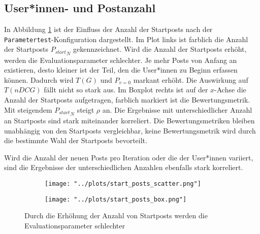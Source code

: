 \subsection{User*innen- und Postanzahl}

In Abbildung \ref{fig:start_posts} ist der Einfluss der Anzahl der Startposts nach der \texttt{Parametertest}-Konfiguration dargestellt. Im Plot links ist farblich die Anzahl der Startposts ${P_{start}}_N$ gekennzeichnet. Wird die Anzahl der Startposts erhöht, werden die Evaluationsparameter schlechter. Je mehr Posts von Anfang an existieren, desto kleiner ist der Teil, den die User*innen zu Beginn erfassen können. Dadurch wird $T(G)$  und $P_{v=0}$ markant erhöht. Die Auswirkung auf $T(nDCG)$ fällt nicht so stark aus. Im Boxplot rechts ist auf der $x$-Achse die Anzahl der Startposts aufgetragen, farblich markiert ist die Bewertungsmetrik. Mit steigendem ${P_{start}}_N$ steigt $\rho$ an. Die Ergebnisse mit unterschiedlicher Anzahl an Startposts sind stark miteinander korreliert. Die Bewertungsmetriken bleiben unabhängig von den Startposts vergleichbar, keine Bewertungsmetrik wird durch die bestimmte Wahl der Startposts bevorteilt.

Wird die Anzahl der neuen Posts pro Iteration oder die der User*innen variiert, sind die Ergebnisse der unterschiedlichen Anzahlen ebenfalls stark korreliert.

\begin{figure}[!h]
	\begin{subfigure}{0.5\textwidth}
		\texttt{[image: "../plots/start\_posts\_scatter.png"]}
	\end{subfigure}
	\begin{subfigure}{0.5\textwidth}
		\texttt{[image: "../plots/start\_posts\_box.png"]}
	\end{subfigure}
	\caption{Durch die Erhöhung der Anzahl von Startposts werden die Evaluationsparameter schlechter}
	\label{fig:start_posts}	
\end{figure}













